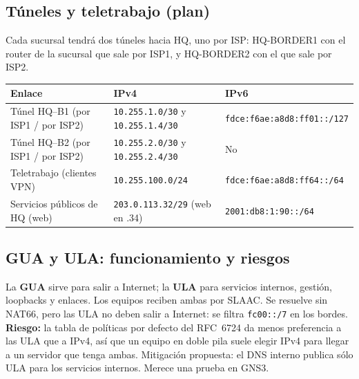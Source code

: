 \documentclass[11pt,a4paper]{article}
\newcommand{\cod}[1]{\texttt{#1}}
\begin{document}
\subsection{Túneles y teletrabajo (plan)}
Cada sucursal tendrá dos túneles hacia HQ, uno por ISP: HQ-BORDER1 con el router de la sucursal que sale por ISP1, y HQ-BORDER2 con el que sale por ISP2.
\begin{center}\footnotesize
\begin{tabular}{@{}p{6.4cm}p{4.6cm}p{5.2cm}@{}}
\toprule
\textbf{Enlace} & \textbf{IPv4} & \textbf{IPv6}\\
\midrule
Túnel HQ--B1 (por ISP1 / por ISP2) & \cod{10.255.1.0/30} y \cod{10.255.1.4/30} & \cod{fdce:f6ae:a8d8:ff01::/127}\\
Túnel HQ--B2 (por ISP1 / por ISP2) & \cod{10.255.2.0/30} y \cod{10.255.2.4/30} & No\\
Teletrabajo (clientes VPN) & \cod{10.255.100.0/24} & \cod{fdce:f6ae:a8d8:ff64::/64}\\
Servicios públicos de HQ (web) & \cod{203.0.113.32/29} (web en .34) & \cod{2001:db8:1:90::/64}\\
\bottomrule
\end{tabular}
\end{center}

\subsection{GUA y ULA: funcionamiento y riesgos}\label{sec:gua}
La \textbf{GUA} sirve para salir a Internet; la \textbf{ULA} para servicios internos, gestión, loopbacks y enlaces. Los equipos reciben ambas por SLAAC. Se resuelve sin NAT66, pero las ULA no deben salir a Internet: se filtra \cod{fc00::/7} en los bordes. \textbf{Riesgo:} la tabla de políticas por defecto del RFC~6724 da menos preferencia a las ULA que a IPv4, así que un equipo en doble pila suele elegir IPv4 para llegar a un servidor que tenga ambas. Mitigación propuesta: el DNS interno publica sólo ULA para los servicios internos. Merece una prueba en GNS3.
\end{document}
